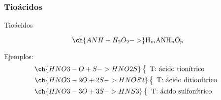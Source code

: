 \subsubsection*{Tioácidos}
\begin{Theorem*} {Tioácidos}
	\begin{figure}[H]
		\centering
	\end{figure}
	$$\ch{ANH + H_2O_2 ->}\mathrm{H}_m\mathrm{ANH}_n\mathrm{O}_p$$
\end{Theorem*}
\noindent Ejemplos:
\begin{align*}
	&\ch{HNO3 - O + S -> HNO2S}\left\{\begin{array}{l}
		\text{T: ácido tionítrico}
	\end{array}\right. \\
	&\ch{HNO3 - 2 O + 2 S -> HNOS2}\left\{\begin{array}{l}
		\text{T: ácido ditionítrico}
	\end{array}\right. \\
	&\ch{HNO3 - 3 O + 3 S -> HNS3}\left\{\begin{array}{l}
		\text{T: ácido sulfonítrico}
	\end{array}\right. \\
\end{align*}